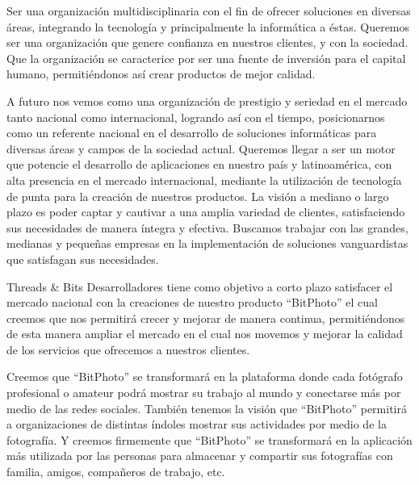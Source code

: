 \documentclass{memoria}
\begin{document}


Ser una organización multidisciplinaria con el fin de ofrecer soluciones en diversas áreas, integrando la tecnología y principalmente la informática a éstas. Queremos ser una organización que genere confianza en nuestros clientes, y con la sociedad. Que la organización se caracterice por ser una fuente de inversión para el capital humano, permitiéndonos así crear productos de mejor calidad.

A futuro nos vemos como una organización de prestigio y seriedad en el mercado tanto nacional como internacional, logrando así con el tiempo, posicionarnos como un referente nacional en el desarrollo de soluciones informáticas para diversas áreas y campos de la sociedad actual. Queremos llegar a ser un motor que potencie el desarrollo de aplicaciones en nuestro país y latinoamérica, con alta presencia en el mercado internacional, mediante la utilización de tecnología de punta para la creación de nuestros productos. La visión a mediano o largo plazo es poder captar y cautivar a una amplia variedad de clientes, satisfaciendo sus necesidades de manera íntegra y efectiva. Buscamos trabajar con las grandes, medianas y pequeñas empresas en la implementación de soluciones vanguardistas que satisfagan sus necesidades.

Threads \& Bits Desarrolladores tiene como objetivo a corto plazo satisfacer el mercado nacional con la creaciones de nuestro producto “BitPhoto” el cual creemos que nos permitirá crecer y mejorar de manera continua, permitiéndonos de esta manera ampliar el mercado en el cual nos movemos  y mejorar la calidad de los servicios que ofrecemos a nuestros clientes.

Creemos que “BitPhoto” se transformará en la plataforma donde cada fotógrafo profesional o amateur podrá mostrar su trabajo al mundo y conectarse más por medio de las redes sociales.  También tenemos la visión que “BitPhoto” permitirá a organizaciones de distintas índoles mostrar sus actividades por medio de la fotografía. Y creemos firmemente que “BitPhoto” se transformará en la aplicación más utilizada por las personas para almacenar y compartir sus fotografías con familia, amigos, compañeros de trabajo, etc.




\end{document}
